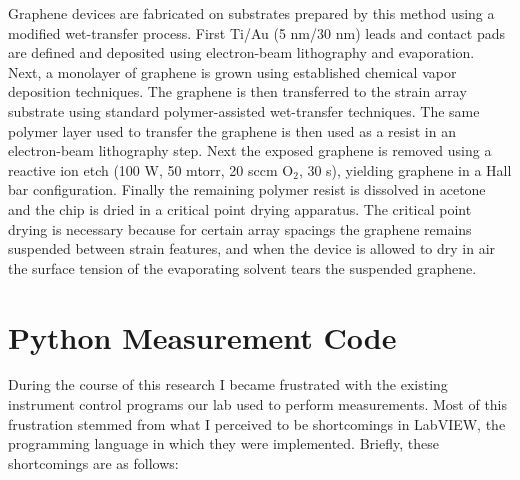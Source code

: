 \documentclass[edeposit,fullpage,draftthesis]{uiucthesis2009}
\begin{document}
\begin{appendices}
            Graphene devices are fabricated on substrates prepared by this method using a modified wet-transfer process.
            First Ti/Au (5 nm/30 nm) leads and contact pads are defined and deposited using 
            electron-beam lithography and evaporation. 
            Next, a monolayer of graphene is grown using established chemical vapor deposition techniques\cite{Li2009}. 
            The graphene is then transferred to the strain array substrate using standard polymer-assisted wet-transfer 
            techniques\cite{li2009transfer}. The same polymer layer used to transfer the graphene is then used as a 
            resist in an electron-beam lithography step. Next the exposed graphene is removed using a reactive ion etch 
            (100 W, 50 mtorr, 20 sccm O$_2$, 30 s), yielding graphene in a Hall bar configuration. Finally the remaining 
            polymer resist is dissolved in acetone and the chip is dried in a critical point drying apparatus. 
            The critical point drying is necessary because for certain array spacings the graphene remains suspended between
            strain features, and when the device is allowed to dry in air the surface tension 
            of the evaporating solvent tears the suspended graphene.
 
\chapter{Python Measurement Code}

During the course of this research I became frustrated with the existing instrument control programs
our lab used to perform measurements.
Most of this frustration stemmed from what I perceived to be shortcomings in LabVIEW, the programming
language in which they were implemented. Briefly, these shortcomings are as follows:


\end{appendices}
\end{document}
